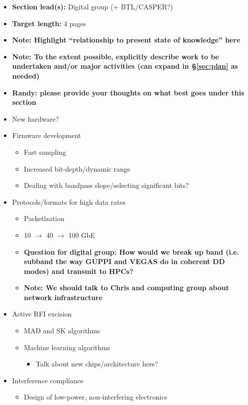 \documentclass[10pt]{NSF}
\begin{document}
\begin{itemize}
\item{\textbf{Section lead(s):} Digital group (+ BTL/CASPER?)}
\item{\textbf{Target length:} 4 pages}
\item{\textbf{Note: Highlight ``relationship to present state of
      knowledge'' here}}
\item{\textbf{Note: To the extent possible, explicitly describe work
      to be undertaken and/or major activities (can expand in
      \S\ref{sec:plan} as needed)}}
\item{\textbf{Randy: please provide your thoughts on what best goes
      under this section}}
\item{New hardware?}
\item{Firmware development}
  \begin{itemize}
  \item{Fast sampling}
  \item{Increased bit-depth/dynamic range}
  \item{Dealing with bandpass slope/selecting significant bits?}
  \end{itemize}
\item{Protocols/formats for high data rates}
  \begin{itemize}
  \item{Packetization}
  \item{10 $\rightarrow$ 40 $\rightarrow$ 100 GbE}
  \item{\textbf{Question for digital group: How would we break up band
        (i.e. subband the way GUPPI and VEGAS do in coherent DD modes)
        and transmit to HPCs?}}
  \item{\textbf{Note: We should talk to Chris and computing group
        about network infrastructure}}
  \end{itemize}
\item{Active RFI excision}
  \begin{itemize}
  \item{MAD and SK algorithms}
  \item{Machine learning algorithms}
    \begin{itemize}
    \item{Talk about new chips/architecture here?}
    \end{itemize}
  \end{itemize}
\item{Interference compliance}
  \begin{itemize}
  \item{Design of low-power, non-interfering electronics}

\end{itemize}
\end{itemize}
\end{document}
